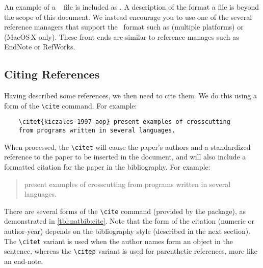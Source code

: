 An example of a \BibTeX\  file is included as
.  A description of the format a 
file is beyond the scope of this document.  We instead encourage
you to use one of the several reference managers that support the
\BibTeX\ format such as
 (multiple platforms) or
 (MacOS\,X only). 
These front ends are similar to reference manages such as
EndNote or RefWorks.


\subsection{Citing References}

Having described some references, we then need to cite them.  We
do this using a form of the \verb+\cite+ command.  For example:
\begin{lstlisting}
    \citet{kiczales-1997-aop} present examples of crosscutting 
    from programs written in several languages.
\end{lstlisting}
When processed, the \verb+\citet+ will cause the paper's authors
and a standardized reference to the paper to be inserted in the
document, and will also include a formatted citation for the paper
in the bibliography.  For example:
\begin{quote}
    \citet{kiczales-1997-aop} present examples of crosscutting 
    from programs written in several languages.
\end{quote}
There are several forms of the \verb+\cite+ command (provided
by the  package), as demonstrated in
\autoref{tbl:natbib:cite}.
Note that the form of the citation (numeric or author-year) depends
on the bibliography style (described in the next section).
The \verb+\citet+ variant is used when the author names form
an object in the sentence, whereas the \verb+\citep+ variant
is used for parenthetic references, more like an end-note.
